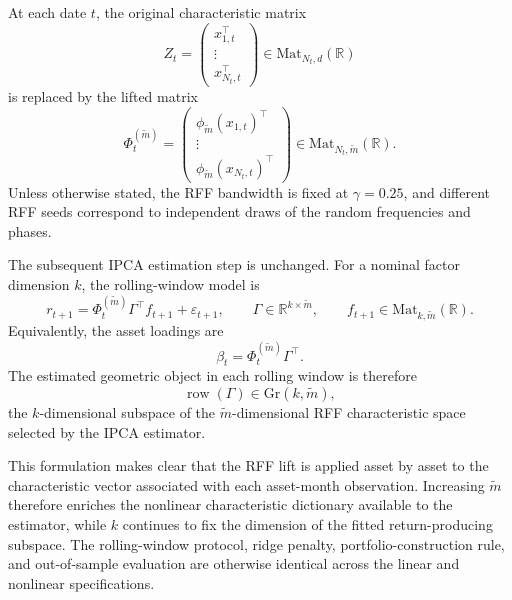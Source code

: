 \documentclass[11pt,letterpaper]{article}
\newcommand{\gr}{\mathrm{Gr}}
\newcommand{\bR}{\mathbb{R}}
\begin{document}
At each date $t$, the original characteristic matrix
\begin{equation*}
	Z_t =
	\begin{pmatrix}
		x_{1,t}^{\top}\\
		\vdots\\
		x_{N_t,t}^{\top}
	\end{pmatrix}
	\in \mathrm{Mat}_{N_t,d}(\bR)
\end{equation*}
is replaced by the lifted matrix
\begin{equation*}
	\Phi_t^{(\tilde m)}
	=
	\begin{pmatrix}
		\phi_{\tilde m}(x_{1,t})^{\top}\\
		\vdots\\
		\phi_{\tilde m}(x_{N_t,t})^{\top}
	\end{pmatrix}
	\in \mathrm{Mat}_{N_t,\tilde m}(\bR).
\end{equation*}
Unless otherwise stated, the RFF bandwidth is fixed at $\gamma=0.25$, and
different RFF seeds correspond to independent draws of the random frequencies
and phases.

The subsequent IPCA estimation step is unchanged. For a nominal factor
dimension $k$, the rolling-window model is
\begin{equation*}
	r_{t+1}
	=
	\Phi_t^{(\tilde m)}\Gamma^\top f_{t+1}
	+
	\varepsilon_{t+1},
	\qquad
	\Gamma\in \mathbb{R}^{k\times \tilde m},
	\qquad
	f_{t+1}\in \mathrm{Mat}_{k,\tilde m}(\bR).
\end{equation*}
Equivalently, the asset loadings are
\begin{equation*}
	\beta_t
	=
	\Phi_t^{(\tilde m)}\Gamma^\top .
\end{equation*}
The estimated geometric object in each rolling window is therefore
\begin{equation*}
	\operatorname{row}(\Gamma)\in \gr(k,\tilde m),
\end{equation*}
the $k$-dimensional subspace of the $\tilde m$-dimensional RFF characteristic
space selected by the IPCA estimator.

This formulation makes clear that the RFF lift is
applied asset by asset to the characteristic vector associated with each
asset-month observation. Increasing $\tilde m$ therefore enriches the nonlinear
characteristic dictionary available to the estimator, while $k$ continues to
fix the dimension of the fitted return-producing subspace. The rolling-window
protocol, ridge penalty, portfolio-construction rule, and out-of-sample
evaluation are otherwise identical across the linear and nonlinear
specifications.
\end{document}
